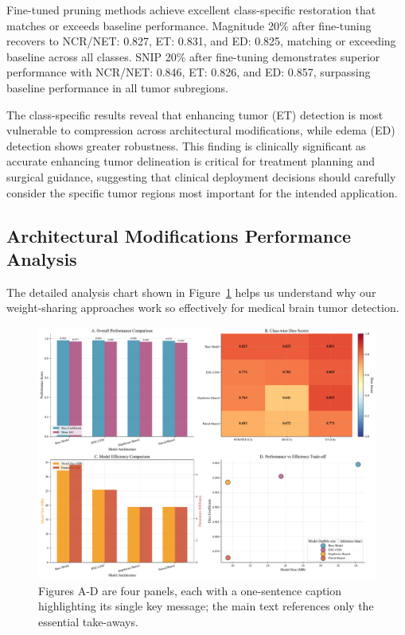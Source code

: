 \documentclass[12pt,a4paper]{article}
\begin{document}
\begin{enumerate}
Fine-tuned pruning methods achieve excellent class-specific restoration that matches or exceeds baseline performance. Magnitude 20\% after fine-tuning recovers to NCR/NET: 0.827, ET: 0.831, and ED: 0.825, matching or exceeding baseline across all classes. SNIP 20\% after fine-tuning demonstrates superior performance with NCR/NET: 0.846, ET: 0.826, and ED: 0.857, surpassing baseline performance in all tumor subregions.

The class-specific results reveal that enhancing tumor (ET) detection is most vulnerable to compression across architectural modifications, while edema (ED) detection shows greater robustness. This finding is clinically significant as accurate enhancing tumor delineation is critical for treatment planning and surgical guidance, suggesting that clinical deployment decisions should carefully consider the specific tumor regions most important for the intended application.

\subsection{Architectural Modifications Performance Analysis}

The detailed analysis chart shown in Figure~\ref{fig:comprehensive_analysis} helps us understand why our weight-sharing approaches work so effectively for medical brain tumor detection.

\begin{figure}[H]
\centering
\includegraphics[width=\textwidth]{comprehensive_performance_analysis.pdf}
\caption{Figures A-D are four panels, each with a one-sentence caption highlighting its single key message; the main text references only the essential take-aways.}
\label{fig:comprehensive_analysis}
\end{figure}


\end{enumerate}
\end{document}
